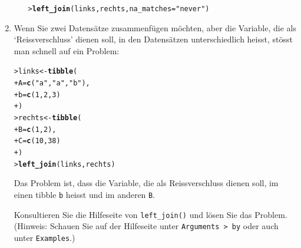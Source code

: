 \documentclass[oneside, 10pt]{book}\usepackage[]{graphicx}\usepackage[]{xcolor}
\makeatletter
\newcommand{\hlnum}[1]{\textcolor[rgb]{0.686,0.059,0.569}{#1}}%
\newcommand{\hlstr}[1]{\textcolor[rgb]{0.192,0.494,0.8}{#1}}%
\newcommand{\hlstd}[1]{\textcolor[rgb]{0.345,0.345,0.345}{#1}}%
\newcommand{\hlkwb}[1]{\textcolor[rgb]{0.69,0.353,0.396}{#1}}%
\newcommand{\hlkwc}[1]{\textcolor[rgb]{0.333,0.667,0.333}{#1}}%
\newcommand{\hlkwd}[1]{\textcolor[rgb]{0.737,0.353,0.396}{\textbf{#1}}}%
\newenvironment{kframe}{%
 \def\at@end@of@kframe{}%
 \ifinner\ifhmode%
  \def\at@end@of@kframe{\end{minipage}}%
  \begin{minipage}{\columnwidth}%
 \fi\fi%
 \def\FrameCommand##1{\hskip\@totalleftmargin \hskip-\fboxsep
 \colorbox{shadecolor}{##1}\hskip-\fboxsep
     \hskip-\linewidth \hskip-\@totalleftmargin \hskip\columnwidth}%
 \MakeFramed {\advance\hsize-\width
   \@totalleftmargin\z@ \linewidth\hsize
   \@setminipage}}%
 {\par\unskip\endMakeFramed%
 \at@end@of@kframe}
\newenvironment{knitrout}{}{} %
\makeatother
\begin{document}
\begin{enumerate}
\begin{enumerate}
\begin{knitrout}
\color{fgcolor}\begin{kframe}
\begin{alltt}
\hlstd{> }\hlkwd{left_join}\hlstd{(links, rechts,} \hlkwc{na_matches} \hlstd{=} \hlstr{"never"}\hlstd{)}
\end{alltt}
\end{kframe}
\end{knitrout}

  \end{enumerate}
  
  \item Wenn Sie zwei Datensätze zusammenfügen möchten,
  aber die Variable, die als `Reissverschluss' dienen soll,
  in den Datensätzen unterschiedlich heisst, stösst man schnell
  auf ein Problem:
  
\begin{knitrout}
\color{fgcolor}\begin{kframe}
\begin{alltt}
\hlstd{> }\hlstd{links} \hlkwb{<-} \hlkwd{tibble}\hlstd{(}
\hlstd{+ }  \hlkwc{A} \hlstd{=} \hlkwd{c}\hlstd{(}\hlstr{"a"}\hlstd{,} \hlstr{"a"}\hlstd{,} \hlstr{"b"}\hlstd{),}
\hlstd{+ }  \hlkwc{b} \hlstd{=} \hlkwd{c}\hlstd{(}\hlnum{1}\hlstd{,} \hlnum{2}\hlstd{,} \hlnum{3}\hlstd{)}
\hlstd{+ }\hlstd{)}
\hlstd{> }\hlstd{rechts} \hlkwb{<-} \hlkwd{tibble}\hlstd{(}
\hlstd{+ }  \hlkwc{B} \hlstd{=} \hlkwd{c}\hlstd{(}\hlnum{1}\hlstd{,} \hlnum{2}\hlstd{),}
\hlstd{+ }  \hlkwc{C} \hlstd{=} \hlkwd{c}\hlstd{(}\hlnum{10}\hlstd{,} \hlnum{38}\hlstd{)}
\hlstd{+ }\hlstd{)}
\hlstd{> }\hlkwd{left_join}\hlstd{(links, rechts)}
\end{alltt}


{\ttfamily\noindent\bfseries\color{errorcolor}{Error in `left\_join()`:\\! `by` must be supplied when `x` and `y` have no\\ \ common variables.\\i use by = character()` to perform a cross-join.}}\end{kframe}
\end{knitrout}

Das Problem ist, dass die Variable, die als Reissverschluss dienen soll,
im einen tibble \texttt{b} heisst und im anderen \texttt{B}.

Konsultieren Sie die Hilfeseite von \texttt{left\_join()}
und lösen Sie das Problem. 
(Hinweis: Schauen Sie auf der Hilfeseite unter \texttt{Arguments > by} oder
auch unter \texttt{Examples}.)


\end{enumerate}
\end{document}
